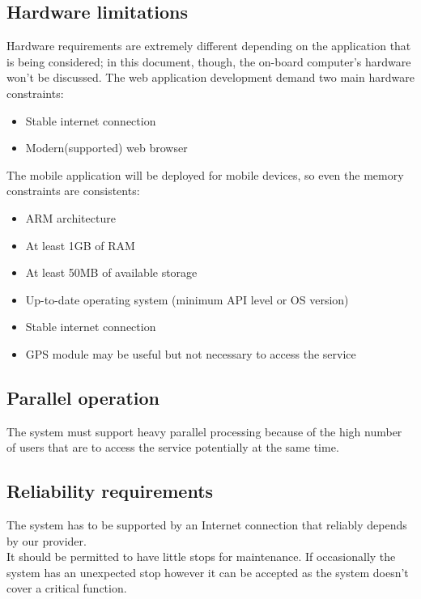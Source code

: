 \subsection{Hardware limitations}
\label{subsec: hw_constraints}
Hardware requirements are extremely different depending on the application that is being considered; in this document, though, the on-board computer's hardware won't be discussed.
The web application development demand two main hardware constraints: 
\begin{itemize}
	\item{Stable internet connection}
	\item{Modern(supported) web browser}
\end{itemize}
The mobile application will be deployed for mobile devices, so even the memory constraints are consistents:
\begin{itemize}
	\item{ARM architecture}
	\item{At least 1GB of RAM}
	\item{At least 50MB of available storage}
	\item{Up-to-date operating system (minimum API level or OS version)} 
	\item{Stable internet connection}
	\item{GPS module may be useful but not necessary to access the service}
\end{itemize}

\subsection{Parallel operation}
The system must support heavy parallel processing because of the high number of users that are to access the service potentially at the same time.

\subsection{Reliability requirements}
The system has to be supported by an Internet connection that reliably depends by our provider.  
\\It should be permitted to have little stops for maintenance. If occasionally the system has an unexpected stop however it can be accepted as the system doesn't cover a critical function. 

